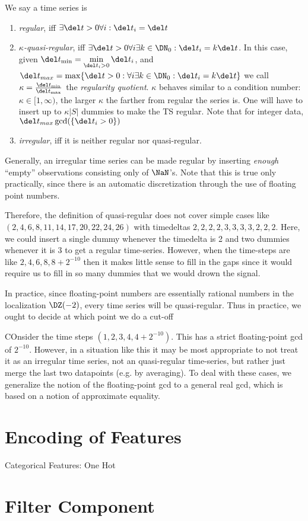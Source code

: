 \documentclass[a4paper,11pt,reqno]{scrartcl}
\begin{document}
%
\begin{definition}[]\label{def: label}
  We say a time series is

%
\begin{enumerate}%
  \item \emph{regular}, iff $\exists \del t>0 \forall i: \del t_i = \del t$ 
  \item \emph{$\kappa$-quasi-regular}, iff $\exists \del t>0 \forall i\exists k\in \DN_{0} : \del t_i = k\del t$. In this case, given  $\del t_{\min} =  \min\limits_{\del t_i > 0} \del t_i$, and $\del t_{max} = \max\{\del t>0 : \forall i\exists k\in \DN_{0} : \del t_i = k\del t\}$ we call $\kappa = \frac{\del t_{\min}}{\del t_{\max}}$ the \emph{regularity quotient}. $\kappa$ behaves similar to a condition number: $\kappa\in[1, \infty)$, the larger $\kappa$ the farther from regular the series is. One will have to insert up to $\kappa|S|$ dummies to make the TS regular. Note that for integer data, $\del t_{max} \gcd(\{\del t_i>0\})$
  \item \emph{irregular}, iff it is neither regular nor quasi-regular.
\end{enumerate}%

Generally, an irregular time series can be made regular by inserting \emph{enough} ``empty'' observations consisting only of $\NaN$'s. Note that this is true only practically, since there is an automatic discretization through the use of floating point numbers.

Therefore, the definition of quasi-regular does not cover simple cases like $(2,4,6,8,11,14,17,20,22,24,26)$ with timedeltas $2,2,2,2,3,3,3,3,2,2,2$. Here, we could insert a single dummy whenever the timedelta is 2 and two dummies whenever it is $3$ to get a regular time-series. However, when the time-steps are like $2,4,6,8, 8+2^{-10}$ then it makes little sense to fill in the gaps since it would require us to fill in so many dummies that we would drown the signal.


In practice, since floating-point numbers are essentially rational numbers in the localization $\DZ(-2)$, every time series will be quasi-regular. Thus in practice, we ought to decide at which point we do a cut-off

\end{definition}

%
\begin{example}[title]\label{ex: label}%
  COnsider the time steps $(1,2,3,4,4+2^{-10})$. This has a strict floating-point gcd of $2^{-10}$. However, in a situation like this it may be most appropriate to not treat it as an irregular time series, not an quasi-regular time-series, but rather just merge the last two datapoints (e.g. by averaging). To deal with these cases, we generalize the notion of the floating-point gcd to a general real gcd, which is based on a notion of approximate equality.
\end{example}%




\section{Encoding of Features}

Categorical Features: One Hot


\section{Filter Component}
\end{document}
